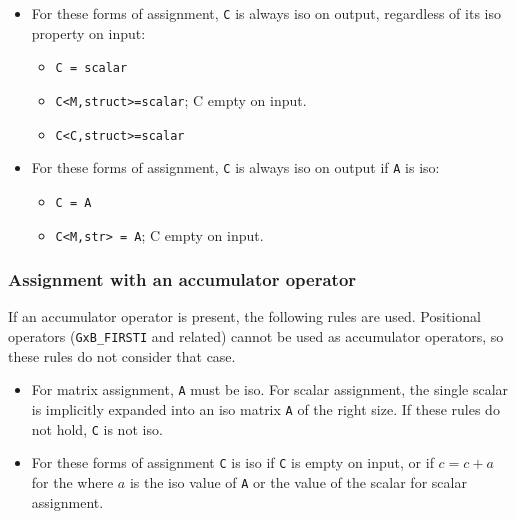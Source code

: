 \documentclass[12pt]{article}
\begin{document}
{\begin{itemize}
\item
For these forms of assignment, \verb'C' is always iso on output, regardless
of its iso property on input:

                \begin{itemize}
                \item \verb'C = scalar'
                \item \verb'C<M,struct>=scalar'; C empty on input.
                \item \verb'C<C,struct>=scalar'
                \end{itemize}

\item
For these forms of assignment, \verb'C' is always iso on output if \verb'A'
is iso:

                \begin{itemize}
                \item \verb'C = A'
                \item \verb'C<M,str> = A'; C empty on input.
                \end{itemize}
\end{itemize}


\subsubsection{Assignment with an accumulator operator}

If an accumulator operator is present, the following rules are used.
Positional operators (\verb'GxB_FIRSTI' and related) cannot be used as
accumulator operators, so these rules do not consider that case.

\begin{itemize}
\item 
For matrix assignment, \verb'A' must be iso.  For scalar assignment, the single
scalar is implicitly expanded into an iso matrix \verb'A' of the right size.
If these rules do not hold, \verb'C' is not iso.

\item For these forms of assignment \verb'C' is iso if \verb'C' is 
empty on input, or if $c=c+a$ for the where $a$ is the iso value of \verb'A' or
the value of the scalar for scalar assignment.


\end{itemize}}
\end{document}
